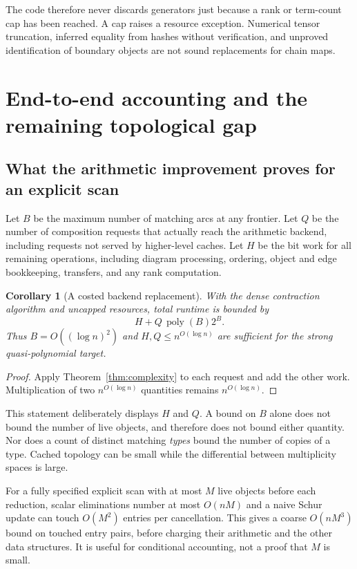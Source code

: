 \documentclass[11pt]{article}
\newtheorem{corollary}[theorem]{Corollary}
\theoremstyle{definition}\newtheorem{definition}[theorem]{Definition}
\theoremstyle{remark}\newtheorem{remark}[theorem]{Remark}
\newcommand{\poly}{\operatorname{poly}}
\begin{document}
The code therefore never discards generators just because a rank or term-count cap has been reached. A cap raises a resource exception. Numerical tensor truncation, inferred equality from hashes without verification, and unproved identification of boundary objects are not sound replacements for chain maps.

\section{End-to-end accounting and the remaining topological gap}
\label{sec:accounting}
\subsection{What the arithmetic improvement proves for an explicit scan}
Let $B$ be the maximum number of matching arcs at any frontier. Let $Q$ be the number of composition requests that actually reach the arithmetic backend, including requests not served by higher-level caches. Let $H$ be the bit work for all remaining operations, including diagram processing, ordering, object and edge bookkeeping, transfers, and any rank computation.

\begin{corollary}[A costed backend replacement]\label{cor:scan}
With the dense contraction algorithm and uncapped resources, total runtime is bounded by
\[
 H+Q\,\poly(B)2^B.
\]
Thus $B=O((\log n)^2)$ and $H,Q\leq n^{O(\log n)}$ are sufficient for the strong quasi-polynomial target.
\end{corollary}
\begin{proof}
Apply Theorem~\ref{thm:complexity} to each request and add the other work. Multiplication of two $n^{O(\log n)}$ quantities remains $n^{O(\log n)}$.
\end{proof}

This statement deliberately displays $H$ and $Q$. A bound on $B$ alone does not bound the number of live objects, and therefore does not bound either quantity. Nor does a count of distinct matching \emph{types} bound the number of copies of a type. Cached topology can be small while the differential between multiplicity spaces is large.

For a fully specified explicit scan with at most $M$ live objects before each reduction, scalar eliminations number at most $O(nM)$ and a naive Schur update can touch $O(M^2)$ entries per cancellation. This gives a coarse $O(nM^3)$ bound on touched entry pairs, before charging their arithmetic and the other data structures. It is useful for conditional accounting, not a proof that $M$ is small.
\end{document}
